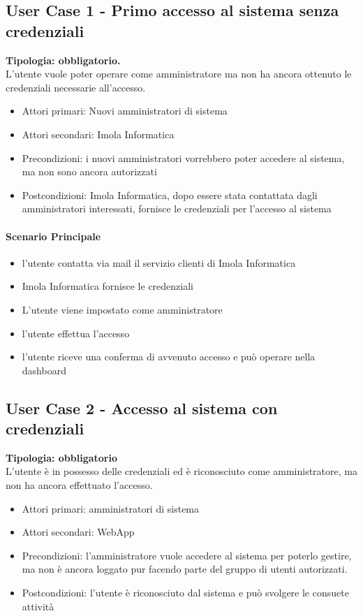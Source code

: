 \documentclass[12pt]{article}
\begin{document}
\subsection{User Case 1 - Primo accesso al sistema senza credenziali}
\textbf{Tipologia: obbligatorio.} \\
L'utente vuole poter operare come amministratore ma non ha ancora ottenuto le credenziali necessarie all'accesso.
\begin{itemize}
	\item Attori primari: Nuovi amministratori di sistema
	\item Attori secondari: Imola Informatica
	\item Precondizioni: i nuovi amministratori vorrebbero poter accedere al sistema, ma non sono ancora autorizzati
	\item Postcondizioni: Imola Informatica, dopo essere stata contattata dagli amministratori interessati, fornisce le credenziali per l'accesso al sistema
\end{itemize}
\paragraph{Scenario Principale}
\begin{itemize}
	\item l'utente contatta via mail il servizio clienti di Imola Informatica
	\item Imola Informatica fornisce le credenziali
	\item L'utente viene impostato come amministratore
	\item l'utente effettua l'accesso
	\item l'utente riceve una conferma di avvenuto accesso e può operare nella dashboard
\end{itemize}

\subsection{User Case 2 - Accesso al sistema con credenziali}
\textbf{Tipologia: obbligatorio} \\
L'utente è in possesso delle credenziali ed è riconosciuto come amministratore, ma non ha ancora effettuato l'accesso.
\begin{itemize}
	\item Attori primari: amministratori di sistema
	\item Attori secondari: WebApp
	\item Precondizioni: l'amministratore vuole accedere al sistema per poterlo gestire, ma non è ancora loggato pur facendo parte del gruppo di utenti autorizzati.
	\item Postcondizioni: l'utente è riconosciuto dal sistema e può svolgere le consuete attività
\end{itemize}
\end{document}
